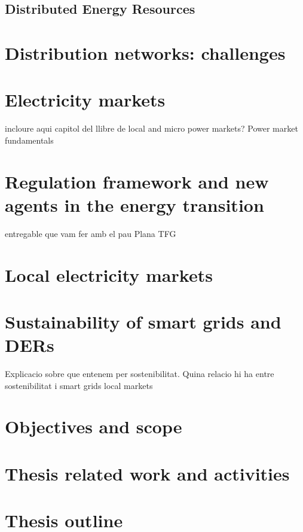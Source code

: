\subsection{Distributed Energy Resources} \label{subsec:DG}

\section{Distribution networks: challenges}

\section{Electricity markets}
incloure aqui capitol del llibre de local and micro power markets? 
Power market fundamentals 


\section{Regulation framework and new agents in the energy transition}
entregable que vam fer amb el pau Plana TFG

\section{Local electricity markets}

\section{Sustainability of smart grids and DERs}
Explicacio sobre que entenem per sostenibilitat. Quina relacio hi ha entre sostenibilitat i smart grids local markets 

\newpage 
\section{Objectives and scope}

\newpage 
\section{Thesis related work and activities}
	

\newpage 
\section{Thesis outline}
	


